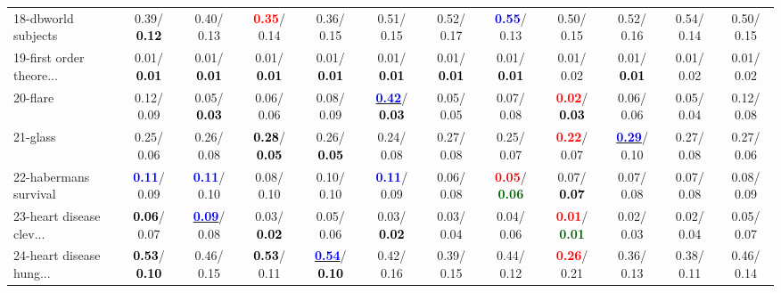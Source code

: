 \begin{table}[h]
\begin{center}
{\begin{tabular}{lc|c|c|c|c|c|c|c|c|c|c}
18-dbworld subjects &   0.39/\textcolor{black}{\textbf{  0.12}} &   0.40/  0.13 & \textcolor{red}{\textbf{  0.35}}/  0.14 &   0.36/  0.15 &   0.51/  0.15 &   0.52/  0.17 & \textcolor{blue}{\textbf{  0.55}}/  0.13 &   0.50/  0.15 &   0.52/  0.16 &   0.54/  0.14 &   0.50/  0.15 \\
19-first order theore... &   0.01/\textcolor{black}{\textbf{  0.01}} &   0.01/\textcolor{black}{\textbf{  0.01}} &   0.01/\textcolor{black}{\textbf{  0.01}} &   0.01/\textcolor{black}{\textbf{  0.01}} &   0.01/\textcolor{black}{\textbf{  0.01}} &   0.01/\textcolor{black}{\textbf{  0.01}} &   0.01/\textcolor{black}{\textbf{  0.01}} &   0.01/  0.02 &   0.01/\textcolor{black}{\textbf{  0.01}} &   0.01/  0.02 &   0.01/  0.02 \\
20-flare &   0.12/  0.09 &   0.05/\textcolor{black}{\textbf{  0.03}} &   0.06/  0.06 &   0.08/  0.09 & \underline{\textcolor{blue}{\textbf{  0.42}}}/\textcolor{black}{\textbf{  0.03}} &   0.05/  0.05 &   0.07/  0.08 & \textcolor{red}{\textbf{  0.02}}/\textcolor{black}{\textbf{  0.03}} &   0.06/  0.06 &   0.05/  0.04 &   0.12/  0.08 \\
21-glass &   0.25/  0.06 &   0.26/  0.08 & \textcolor{black}{\textbf{  0.28}}/\textcolor{black}{\textbf{  0.05}} &   0.26/\textcolor{black}{\textbf{  0.05}} &   0.24/  0.08 &   0.27/  0.08 &   0.25/  0.07 & \textcolor{red}{\textbf{  0.22}}/  0.07 & \underline{\textcolor{blue}{\textbf{  0.29}}}/  0.10 &   0.27/  0.08 &   0.27/  0.06 \\ \hline
22-habermans survival & \textcolor{blue}{\textbf{  0.11}}/  0.09 & \textcolor{blue}{\textbf{  0.11}}/  0.10 &   0.08/  0.10 &   0.10/  0.10 & \textcolor{blue}{\textbf{  0.11}}/  0.09 &   0.06/  0.08 & \textcolor{red}{\textbf{  0.05}}/\textcolor{darkgreen}{\textbf{  0.06}} &   0.07/\textcolor{black}{\textbf{  0.07}} &   0.07/  0.08 &   0.07/  0.08 &   0.08/  0.09 \\
23-heart disease clev... & \textcolor{black}{\textbf{  0.06}}/  0.07 & \underline{\textcolor{blue}{\textbf{  0.09}}}/  0.08 &   0.03/\textcolor{black}{\textbf{  0.02}} &   0.05/  0.06 &   0.03/\textcolor{black}{\textbf{  0.02}} &   0.03/  0.04 &   0.04/  0.06 & \textcolor{red}{\textbf{  0.01}}/\textcolor{darkgreen}{\textbf{  0.01}} &   0.02/  0.03 &   0.02/  0.04 &   0.05/  0.07 \\
24-heart disease hung... & \textcolor{black}{\textbf{  0.53}}/\textcolor{black}{\textbf{  0.10}} &   0.46/  0.15 & \textcolor{black}{\textbf{  0.53}}/  0.11 & \underline{\textcolor{blue}{\textbf{  0.54}}}/\textcolor{black}{\textbf{  0.10}} &   0.42/  0.16 &   0.39/  0.15 &   0.44/  0.12 & \textcolor{red}{\textbf{  0.26}}/  0.21 &   0.36/  0.13 &   0.38/  0.11 &   0.46/  0.14 \\

\end{tabular}}
\end{center}
\end{table}
